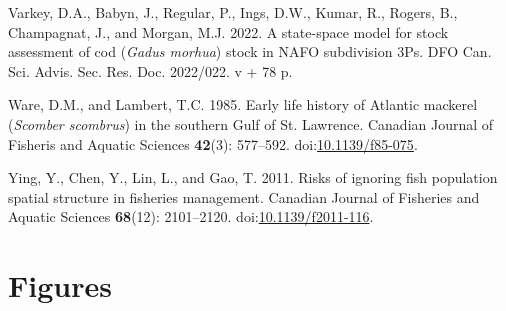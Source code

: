 \documentclass[
]{article}
\newlength{\cslhangindent}
\newlength{\cslentryspacingunit} %
\newenvironment{CSLReferences}[2] %
 {%
  \setlength{\parindent}{0pt}
  \ifodd #1
  \let\oldpar\par
  \def\par{\hangindent=\cslhangindent\oldpar}
  \fi
  \setlength{\parskip}{#2\cslentryspacingunit}
 }%
 {}
\begin{document}
\begin{CSLReferences}{1}{0}
\leavevmode{}%
Varkey, D.A., Babyn, J., Regular, P., Ings, D.W., Kumar, R., Rogers, B., Champagnat, J., and Morgan, M.J. 2022. A state-space model for stock assessment of cod (\emph{{G}adus morhua}) stock in NAFO subdivision 3Ps. {DFO} {Can.} {Sci.} {Advis.} {Sec.} {Res.} {Doc.} 2022/022. v + 78 p.

\leavevmode{}%
Ware, D.M., and Lambert, T.C. 1985. Early life history of {A}tlantic mackerel (\emph{{S}comber scombrus}) in the southern {G}ulf of {S}t. {L}awrence. Canadian Journal of Fisheris and Aquatic Sciences \textbf{42}(3): 577--592. doi:\href{https://doi.org/10.1139/f85-075}{10.1139/f85-075}.

\leavevmode{}%
Ying, Y., Chen, Y., Lin, L., and Gao, T. 2011. Risks of ignoring fish population spatial structure in fisheries management. Canadian Journal of Fisheries and Aquatic Sciences \textbf{68}(12): 2101--2120. doi:\href{https://doi.org/10.1139/f2011-116}{10.1139/f2011-116}.

\end{CSLReferences}

\pagebreak

\pagebreak

\hypertarget{figures}{%
\section*{Figures}\label{figures}}
\end{document}
